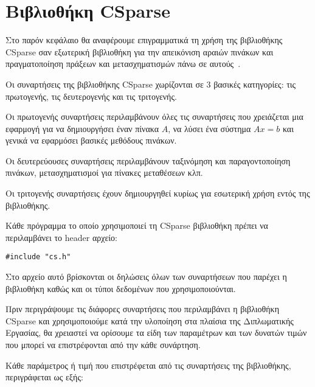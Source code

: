 ﻿
\chapter{Βιβλιοθήκη \textlatin{CSparse}}
\label{ch:chapterCSparse}

Στο παρόν κεφάλαιο θα αναφέρουμε επιγραμματικά τη χρήση της βιβλιοθήκης \textlatin{CSparse} σαν εξωτερική βιβλιοθήκη για την απεικόνιση αραιών πινάκων και πραγματοποίηση πράξεων και μετασχηματισμών πάνω σε αυτούς~\cite{davis2006direct}.

Οι συναρτήσεις της βιβλιοθήκης \textlatin{CSparse} χωρίζονται σε 3 βασικές κατηγορίες: τις πρωτογενής, τις δευτερογενής και τις τριτογενής.

Οι πρωτογενής συναρτήσεις περιλαμβάνουν όλες τις συναρτήσεις που χρειάζεται μια εφαρμογή για να δημιουργήσει έναν πίνακα $A$, να λύσει ένα σύστημα $Ax=b$ και γενικά να εφαρμόσει βασικές μεθόδους πινάκων.

Οι δευτερεύουσες συναρτήσεις περιλαμβάνουν ταξινόμηση και παραγοντοποίηση πινάκων, μετασχηματισμοί για πίνακες μεταθέσεων κλπ.

Οι τριτογενής συναρτήσεις έχουν δημιουργηθεί κυρίως για εσωτερική χρήση εντός της βιβλιοθήκης.

Κάθε πρόγραμμα το οποίο χρησιμοποιεί τη \textlatin{CSparse} βιβλιοθήκη πρέπει να περιλαμβάνει το \textlatin{header} αρχείο: 
\begin{verbatim}#include "cs.h"\end{verbatim}

Στο αρχείο αυτό βρίσκονται οι δηλώσεις όλων των συναρτήσεων που παρέχει η βιβλιοθήκη καθώς και οι τύποι δεδομένων που χρησιμοποιούνται. 

Πριν περιγράψουμε τις διάφορες συναρτήσεις που περιλαμβάνει η βιβλιοθήκη \textlatin{CSparse} και χρησιμοποιούμε κατά την υλοποίηση στα πλαίσια της Διπλωματικής Εργασίας, θα χρειαστεί να ορίσουμε τα είδη των παραμέτρων και των δυνατών τιμών που μπορεί να επιστρέφονται από την κάθε συνάρτηση.

Κάθε παράμετρος ή τιμή που επιστρέφεται από τις συναρτήσεις της βιβλιοθήκης, περιγράφεται ως εξής:

